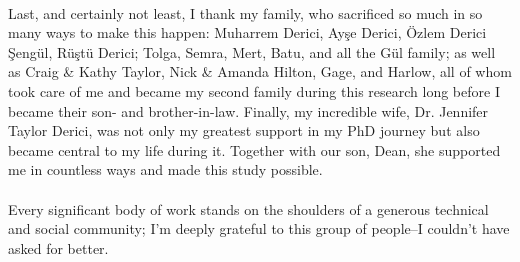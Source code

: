 \paragraph{}%
  Last, and certainly not least, I thank my family, who sacrificed so much in so many ways to make this happen: Muharrem Derici, Ayşe Derici, Özlem Derici Şengül, Rüştü Derici; Tolga, Semra, Mert, Batu, and all the Gül family; as well as Craig \& Kathy Taylor, Nick \& Amanda Hilton, Gage, and Harlow, all of whom took care of me and became my second family during this research long before I became their son- and brother-in-law. Finally, my incredible wife, Dr. Jennifer Taylor Derici, was not only my greatest support in my PhD journey but also became central to my life during it. Together with our son, Dean, she supported me in countless ways and made this study possible.

\paragraph{}%
  Every significant body of work stands on the shoulders of a generous technical and social community; I'm deeply grateful to this group of people--I couldn't have asked for better.



